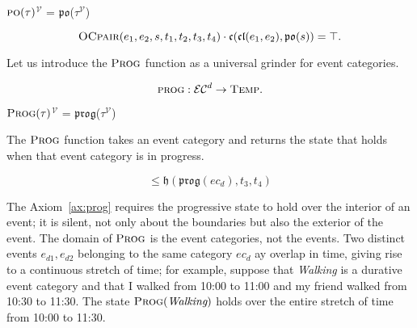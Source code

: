 \begin{defn}
    \textlbrackdbl $\textsc{po}(\tau)$\textrbrackdbl$^{\mathcal{V}}$ = $\mathfrak{po}$(\textlbrackdbl $\tau$\textrbrackdbl$^{\mathcal{V}}$)
\end{defn}

\begin{axiom}\label{ax:po}
    \begin{equation}
        \textsc{OCpair}(e_1, e_2, s, t_1, t_2, t_3, t_4) \cdot \mathfrak{c}(\mathfrak{cl}(e_1, e_2), \mathfrak{po}(s)) = \top.
    \end{equation}
\end{axiom}

Let us introduce the $\textsc{Prog}$ function as a universal grinder for event categories.
\begin{defn}
    \begin{equation}
        \textsc{prog} : \mathcal{EC}^d \to \textsc{Temp}.
    \end{equation}
\end{defn}

\begin{defn}
    \textlbrackdbl $\textsc{Prog}(\tau)$\textrbrackdbl$^{\mathcal{V}}$
    = $\mathfrak{prog}$(\textlbrackdbl $\tau$\textrbrackdbl$^{\mathcal{V}}$)
\end{defn}

The $\textsc{Prog}$ function takes an event category and returns the state that holds when that event category is in progress.
\begin{axiom}\label{ax:prog}
    \begin{equation}
        [
            \textsc{OCpair}(e_1, e_2, s, t_1, t_2, t_3, t_4) \cdot \mathfrak{c}(\mathfrak{cl} (e_1, e_2), ec_d)
        ] \leq  \mathfrak{h}(\mathfrak{prog}(ec_d), t_3, t_4)
    \end{equation}
\end{axiom}

The Axiom~\ref{ax:prog} requires the progressive state to hold over the interior of an event; it is silent, not
only about the boundaries but also the exterior of the event. The domain of $\textsc{Prog}$ is the event categories, not the events.
Two distinct events $e_{d1}, e_{d2}$ belonging to the same category $ec_d$ ay overlap in time, giving rise to a continuous
stretch of time; for example, suppose that \textit{Walking} is a durative event category and that I walked from 10:00 to 11:00 and
my friend walked from 10:30 to 11:30. The state $\textsc{Prog}(\textit{Walking})$ holds over the entire stretch of time from 10:00 to 11:30.

